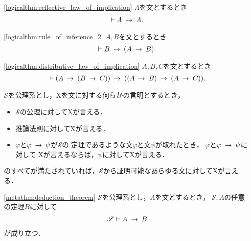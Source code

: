 	\begin{screen}
		\begin{logicalthm}[含意の反射律]
		\ref{logicalthm:reflective_law_of_implication}
			$A$を文とするとき
			\begin{align}
				\vdash A \hspace{0.25em}\rightarrow\hspace{0.25em} A.
			\end{align}
		\end{logicalthm}
	\end{screen}
	
	\begin{screen}
		\begin{logicalthm}[含意の導入]\ref{logicalthm:rule_of_inference_2}
			$A,B$を文とするとき
			\begin{align}
				\vdash B \hspace{0.25em}\rightarrow\hspace{0.25em} (A \hspace{0.25em}\rightarrow\hspace{0.25em} B).
			\end{align}
		\end{logicalthm}
	\end{screen}
	
	\begin{screen}
		\begin{logicalthm}[含意の分配則]
		\ref{logicalthm:distributive_law_of_implication}
			$A,B,C$を文とするとき
			\begin{align}
				\vdash (A \hspace{0.25em}\rightarrow\hspace{0.25em} (B \hspace{0.25em}\rightarrow\hspace{0.25em} C)) \hspace{0.25em}\rightarrow\hspace{0.25em} ((A \hspace{0.25em}\rightarrow\hspace{0.25em} B) \hspace{0.25em}\rightarrow\hspace{0.25em} (A \hspace{0.25em}\rightarrow\hspace{0.25em} C)).
			\end{align}
		\end{logicalthm}
	\end{screen}
	
	\begin{screen}
		\begin{metaaxm}[証明に対する構造的帰納法]
			$\mathscr{S}$を公理系とし，Xを文に対する何らかの言明とするとき，
			\begin{itemize}
				\item $\mathscr{S}$の公理に対してXが言える．
				\item 推論法則に対してXが言える．
				\item $\varphi$と$\varphi \hspace{0.25em}\rightarrow\hspace{0.25em} \psi$が$\mathscr{S}$の
					定理であるような文$\varphi$と文$\psi$が取れたとき，
					$\varphi$と$\varphi \hspace{0.25em}\rightarrow\hspace{0.25em} \psi$に対して
					Xが言えるならば，$\psi$に対してXが言える．
			\end{itemize}
			のすべてが満たされていれば，$\mathscr{S}$から証明可能なあらゆる文に対してXが言える．
		\end{metaaxm}
	\end{screen}
	
	\begin{screen}
		\begin{metathm}[演繹法則]\ref{metathm:deduction_theorem}
			$\mathscr{S}$を公理系とし，$A$を文とするとき，
			$\mathscr{S}, A$の任意の定理$B$に対して
			\begin{align}
				\mathscr{S} \vdash A \hspace{0.25em}\rightarrow\hspace{0.25em} B
			\end{align}
			が成り立つ．
		\end{metathm}
	\end{screen}
	
